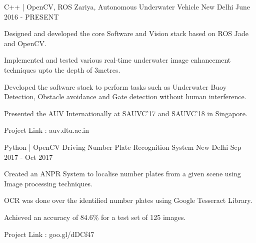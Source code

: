 \begin{cventries}
  \cventry
    {C++ | OpenCV, ROS}
    {Zariya, Autonomous Underwater Vehicle}
    {New Delhi}
    {June 2016 - PRESENT}
    {
      \begin{cvitems}
        \item {Designed and developed the core Software and Vision stack based on ROS Jade and OpenCV.}
        \item {Implemented and tested various real-time underwater image enhancement techniques upto the depth of 3metres.}
        \item {Developed the software stack to perform tasks such as Underwater Buoy Detection, Obstacle avoidance and Gate detection without human interference.}
        \item {Presented the AUV Internationally at SAUVC'17 and SAUVC'18 in Singapore.}
        \item {Project Link : auv.dtu.ac.in}
      \end{cvitems}
    }
  \cventry
    {Python | OpenCV}
    {Driving Number Plate Recognition System}
    {New Delhi}
    {Sep 2017 - Oct 2017}
    {
      \begin{cvitems}
        \item {Created an ANPR System to localise number plates from a given scene using Image processing techniques.}
        \item {OCR was done over the identified number plates using Google Tesseract Library.}
        \item {Achieved an accuracy of 84.6\% for a test set of 125 images.}
        \item {Project Link : goo.gl/dDCf47}
      \end{cvitems}
    }
\end{cventries}
